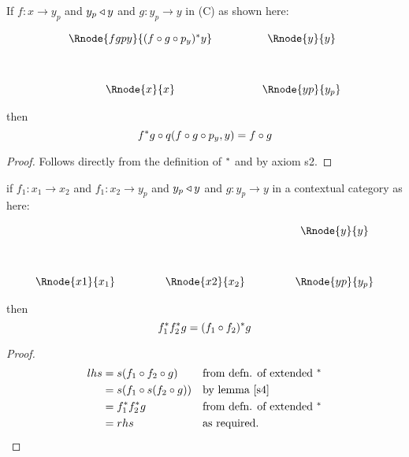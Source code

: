 \documentclass[10pt,a4paper]{scrartcl}
\begin{document}
\begin{lemma} 
\label{lemmastar1}  
If $f:x \longrightarrow y_p$ and $y_p \triangleleft y$ and  $g:y_p \longrightarrow y$ in \cat(C) 
as shown here:
\vspace{3mm}
\begin{center}
\begin{displaymath}
\begin{array}{cp{.9cm}c}
\Rnode{fgpy}{(f \circ g \circ p_y)\sub y} & & \Rnode{y}{y}\\ [1.2cm]
\Rnode{x}{x}         & & \Rnode{yp}{y_p}
\end{array}
\end{displaymath}
\end{center}

then 
$$
f ^* g \circ q(f \circ g \circ p_y,y) = f \circ g
$$
\end{lemma}
\begin{proof}
Follows directly from the definition of $^*$ and by axiom s2.
\end{proof}

\begin{lemma}
\label{lemmastar2}
if $f_1:x_1 \longrightarrow x_2$ and $f_1:x_2 \longrightarrow y_p$
and $y_p \triangleleft y$ and  $g:y_p \longrightarrow y$ in a contextual category  as here:

\vspace{3mm}
\begin{center}
\begin{displaymath}
\begin{array}{cp{.9cm}cp{.9cm}c}
 & & & &\Rnode{y}{y}\\ [1.2cm]
\Rnode{x1}{x_1}         & & \Rnode{x2}{x_2}         & & \Rnode{yp}{y_p}
\end{array}
\end{displaymath}
\end{center}

then
\begin{equation*}
f_1 ^* f_2 ^* g = (f_1 \circ f_2) ^* g
\end{equation*}
\end{lemma}
\begin{proof}
\begin{align*}
lhs &= s(f_1 \circ f_2 \circ g)  && \mbox{from defn. of extended $^*$} \\
    &= s(f_1 \circ s(f_2 \circ g))&&\mbox{by lemma \ref{s4}} \\
		&= f_1 ^* f_2 ^* g       && \mbox{from defn. of extended $^*$} \\
	  &= rhs                                    && \mbox{as required.}
\end{align*}

\end{proof}
\end{document}
